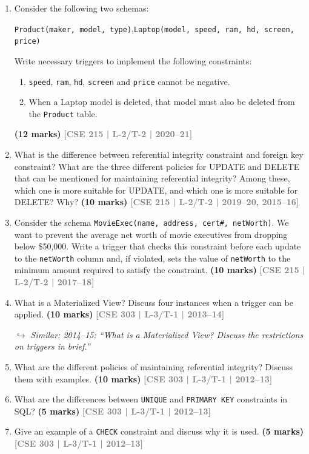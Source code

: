 \documentclass[12pt]{article}
\newcommand{\yr}[1]{\hfill\textcolor{gray}{\small\textbf{[#1]}}}
\newcommand{\mk}[1]{\textcolor{orange!70!black}{\small\textbf{(#1 marks)}}}
\newcommand{\variant}[1]{\par\vspace{1pt}\textcolor{blue!50!black}%
  {\footnotesize\textit{$\hookrightarrow$ Similar: #1}}}
\begin{document}
\begin{enumerate}
\item Consider the following two schemas:
\begin{center}
\texttt{Product(maker, model, type)},\quad \texttt{Laptop(model, speed, ram, hd, screen, price)}
\end{center}
Write necessary triggers to implement the following constraints:
\begin{enumerate}
  \item \texttt{speed}, \texttt{ram}, \texttt{hd}, \texttt{screen} and \texttt{price} cannot be negative.
  \item When a Laptop model is deleted, that model must also be deleted from the \texttt{Product} table.
\end{enumerate}
 \mk{12} \yr{CSE 215 | L-2/T-2 | 2020--21}


\item What is the difference between referential integrity constraint and foreign key constraint? What are the three different policies for UPDATE and DELETE that can be mentioned for maintaining referential integrity? Among these, which one is more suitable for UPDATE, and which one is more suitable for DELETE? Why?
\mk{10} \yr{CSE 215 | L-2/T-2 | 2019--20, 2015--16}


\item Consider the schema \texttt{MovieExec(name, address, cert\#, netWorth)}. We want to prevent the average net worth of movie executives from dropping below \$50,000. Write a trigger that checks this constraint before each update to the \texttt{netWorth} column and, if violated, sets the value of \texttt{netWorth} to the minimum amount required to satisfy the constraint.
\mk{10} \yr{CSE 215 | L-2/T-2 | 2017--18}


\item What is a Materialized View? Discuss four instances when a trigger can be applied.
\mk{10} \yr{CSE 303 | L-3/T-1 | 2013--14}
\variant{2014--15: ``What is a Materialized View? Discuss the restrictions on triggers in brief.''}


\item What are the different policies of maintaining referential integrity? Discuss them with examples.
\mk{10} \yr{CSE 303 | L-3/T-1 | 2012--13}


\item What are the differences between \texttt{UNIQUE} and \texttt{PRIMARY KEY} constraints in SQL?
\mk{5} \yr{CSE 303 | L-3/T-1 | 2012--13}


\item Give an example of a \texttt{CHECK} constraint and discuss why it is used.
\mk{5} \yr{CSE 303 | L-3/T-1 | 2012--13}



\end{enumerate}
\end{document}
